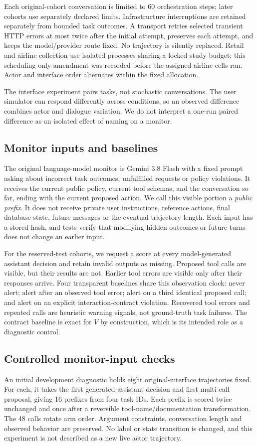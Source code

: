\documentclass[10pt]{article}
\begin{document}
Each original-cohort conversation is limited to 60 orchestration steps; later cohorts use separately declared limits. Infrastructure interruptions are retained separately from bounded task outcomes. A transport retries selected transient HTTP errors at most twice after the initial attempt, preserves each attempt, and keeps the model/provider route fixed. No trajectory is silently replaced. Retail and airline collection use isolated processes sharing a locked study budget; this scheduling-only amendment was recorded before the assigned airline cells ran. Actor and interface order alternates within the fixed allocation.

The interface experiment pairs tasks, not stochastic conversations. The user simulator can respond differently across conditions, so an observed difference combines actor and dialogue variation. We do not interpret a one-run paired difference as an isolated effect of naming on a monitor.

\subsection{Monitor inputs and baselines}
The original language-model monitor is Gemini 3.8 Flash with a fixed prompt asking about incorrect task outcomes, unfulfilled requests or policy violations. It receives the current public policy, current tool schemas, and the conversation so far, ending with the current proposed action. We call this visible portion a \emph{public prefix}. It does not receive private user instructions, reference actions, final database state, future messages or the eventual trajectory length. Each input has a stored hash, and tests verify that modifying hidden outcomes or future turns does not change an earlier input.

For the reserved-test cohorts, we request a score at every model-generated assistant decision and retain invalid outputs as missing. Proposed tool calls are visible, but their results are not. Earlier tool errors are visible only after their responses arrive. Four transparent baselines share this observation clock: never alert; alert after an observed tool error; alert on a third identical proposed call; and alert on an explicit interaction-contract violation. Recovered tool errors and repeated calls are heuristic warning signals, not ground-truth task failures. The contract baseline is exact for $V$ by construction, which is its intended role as a diagnostic control.

\subsection{Controlled monitor-input checks}
An initial development diagnostic holds eight original-interface trajectories fixed. For each, it takes the first generated assistant decision and first multi-call proposal, giving 16 prefixes from four task IDs. Each prefix is scored twice unchanged and once after a reversible tool-name/documentation transformation. The 48 calls rotate arm order. Argument constraints, conversation length and observed behavior are preserved. No label or state transition is changed, and this experiment is not described as a new live actor trajectory.
\end{document}
